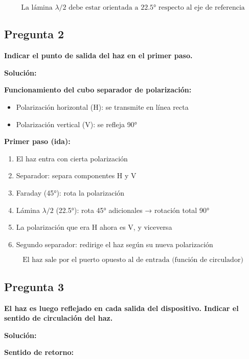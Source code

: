 \documentclass[12pt,a4paper]{article}
\begin{document}
\begin{equation}
\boxed{\text{La lámina } \lambda/2 \text{ debe estar orientada a } 22.5° \text{ respecto al eje de referencia}}
\end{equation}

\subsection*{Pregunta 2}
\textbf{Indicar el punto de salida del haz en el primer paso.}

\vspace{0.3cm}
\textbf{Solución:}

\textbf{Funcionamiento del cubo separador de polarización:}
\begin{itemize}
    \item Polarización horizontal (H): se transmite en línea recta
    \item Polarización vertical (V): se refleja 90°
\end{itemize}

\textbf{Primer paso (ida):}
\begin{enumerate}
    \item El haz entra con cierta polarización
    \item Separador: separa componentes H y V
    \item Faraday (45°): rota la polarización
    \item Lámina $\lambda/2$ (22.5°): rota 45° adicionales → rotación total 90°
    \item La polarización que era H ahora es V, y viceversa
    \item Segundo separador: redirige el haz según su nueva polarización
\end{enumerate}

\begin{equation}
\boxed{\text{El haz sale por el puerto opuesto al de entrada (función de circulador)}}
\end{equation}

\subsection*{Pregunta 3}
\textbf{El haz es luego reflejado en cada salida del dispositivo. Indicar el sentido de circulación del haz.}

\vspace{0.3cm}
\textbf{Solución:}

\textbf{Sentido de retorno:}
\end{document}
